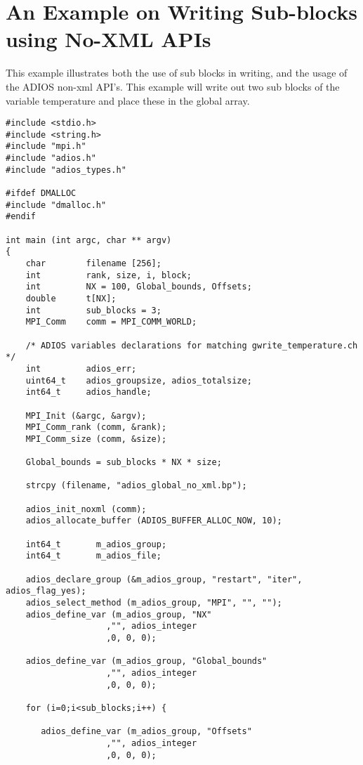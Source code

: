 \section{An Example on Writing Sub-blocks using No-XML APIs}
\label{section-appendix-writing-subblocks}

This example illustrates both the use of sub blocks in writing, and the usage of 
the ADIOS non-xml API's. This example will write out two sub blocks of the variable 
temperature and place these in the global array. 

\begin{lstlisting}[alsolanguage=C]
#include <stdio.h>
#include <string.h>
#include "mpi.h"
#include "adios.h"
#include "adios_types.h"

#ifdef DMALLOC
#include "dmalloc.h"
#endif

int main (int argc, char ** argv)
{
    char        filename [256];
    int         rank, size, i, block;
    int         NX = 100, Global_bounds, Offsets;
    double      t[NX];
    int         sub_blocks = 3;
    MPI_Comm    comm = MPI_COMM_WORLD;

    /* ADIOS variables declarations for matching gwrite_temperature.ch */
    int         adios_err;
    uint64_t    adios_groupsize, adios_totalsize;
    int64_t     adios_handle;

    MPI_Init (&argc, &argv);
    MPI_Comm_rank (comm, &rank);
    MPI_Comm_size (comm, &size);

    Global_bounds = sub_blocks * NX * size;

    strcpy (filename, "adios_global_no_xml.bp");

    adios_init_noxml (comm);
    adios_allocate_buffer (ADIOS_BUFFER_ALLOC_NOW, 10);

    int64_t       m_adios_group;
    int64_t       m_adios_file;

    adios_declare_group (&m_adios_group, "restart", "iter", adios_flag_yes);
    adios_select_method (m_adios_group, "MPI", "", "");
    adios_define_var (m_adios_group, "NX"
                    ,"", adios_integer
                    ,0, 0, 0);

    adios_define_var (m_adios_group, "Global_bounds"
                    ,"", adios_integer
                    ,0, 0, 0);

    for (i=0;i<sub_blocks;i++) {

       adios_define_var (m_adios_group, "Offsets"
                    ,"", adios_integer
                    ,0, 0, 0);


\end{lstlisting}

